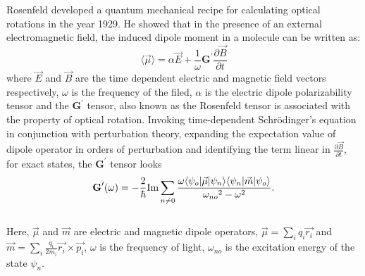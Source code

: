 Rosenfeld developed a quantum mechanical recipe for calculating optical rotations in the year
1929\cite{Rosenfeld29}. He showed that in the presence of an external electromagnetic field,
the induced dipole moment in a molecule can be written as:
\begin{equation}\langle\vec{\mu}\rangle = \alpha\vec{E} + \frac{1}{\omega}\textbf{G}^\prime\frac{\partial\vec{B}}{\partial t}
\end{equation} where $\vec{E} $ and $\vec{B}$ are the time dependent electric and
magnetic field vectors respectively, $\omega$ is the frequency of the filed, $\alpha$ is the electric dipole
polarizability tensor and the $\textbf{G}^\prime$ tensor, also known as the Rosenfeld tensor is associated 
with the property of optical rotation. Invoking time-dependent Schr\"odinger's equation in conjunction 
with perturbation theory, expanding the expectation value of dipole operator in orders of perturbation 
and identifying the term linear in $\frac{\partial\vec{B}}{\partial t}$, 
for exact states, the $\textbf{G}^\prime$ tensor looks 
\\
\begin{equation}
\textbf{G}^{\prime}(\omega) = -\frac{2}{\hbar} \text{Im}\sum_{n \neq 0}\frac{\omega \langle \psi_o |\vec{\mu}| \psi_n \rangle\langle \psi_n |\vec{m}| \psi_o \rangle}{{\omega_{no}}^2 - {\omega}^2 }.
\end{equation}
\\
Here, $\vec{\mu}$ and $\vec{m}$ are electric and magnetic dipole operators, 
$\vec{\mu} = \sum\limits_i q_i \vec{{r}_i}$ and $\vec{m} = \sum\limits_i \frac{q_i}{2m_i} \vec{{r}_i} \times \vec{{p}_i}$, $\omega$ is the frequency of light, $\omega_{no}$ is the excitation energy of the state $\psi_n$.
